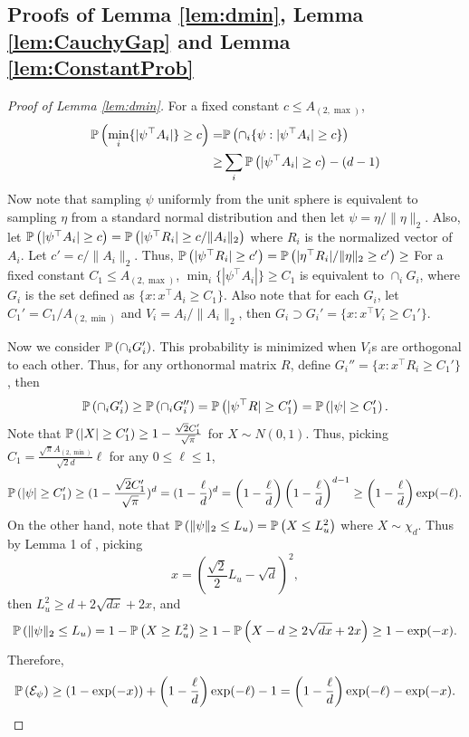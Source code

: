 \subsection{Proofs of Lemma \ref{lem:dmin}, Lemma \ref{lem:CauchyGap} and Lemma \ref{lem:ConstantProb}}
\begin{proof}[Proof of Lemma \ref{lem:dmin}]
For a fixed constant $c \le A_{(2,\max)}$,
\begin{align*}
\mathbb{P}\left(\min_i \{|\psi^{\top}A_i|\} \ge c\right) = & \mathbb{P}\left(\cap_i\{\psi : |\psi^{\top}A_i|\ge c\}\right)\\
 \ge & \sum_i \mathbb{P}\left(|\psi^{\top}A_i|\ge c\right) - (d-1)
\end{align*}
Now note that sampling $\psi$ uniformly from the unit sphere is equivalent to sampling $\eta$ from a standard normal distribution and then let $\psi = \eta/ \|\eta\|_2$.
Also, let $\mathbb{P}\left(|\psi^{\top}A_i|\ge c\right) = \mathbb{P}\left(|\psi^{\top}R_i|\ge c/\|A_i\|_2\right)$ where $R_i$ is the normalized vector of $A_i$. 
Let $c' = c/\|A_i\|_2$. 
Thus, $ \mathbb{P}\left(|\psi^{\top}R_i|\ge c'\right) = \mathbb{P}\left(|\eta^{\top}R_i|/\|\eta\|_2\ge c'\right) \ge $
\fi
For a fixed constant $C_1 \le A_{(2,\max)}$, $\min_i \{|\psi^{\top}A_i|\} \ge C_1$ is equivalent to  $\cap_i G_i$, where $G_i$ is the set defined as $\{x: x^{\top}A_i\ge C_1\}$.  
Also note that for each $G_i$, let $C_1' = C_1/A_{(2,\min)}$ and $V_i = A_i/\|A_i\|_2$, then $G_i \supset G_i' = \{x: x^{\top}V_i\ge C_1'\}$.

Now we consider $\mathbb{P}\left(\cap_i G_i'\right)$. 
This probability is minimized when $V_i$s are orthogonal to each other. 
Thus, for any orthonormal matrix $R$, define $G_i'' = \{x: x^{\top}R_i\ge C_1'\}$, then 
\[
\mathbb{P}\left(\cap_i G_i'\right) \ge \mathbb{P}\left(\cap_i G_i''\right) = \mathbb{P}\left(|\psi^{\top}R| \ge C_1'\right) = \mathbb{P}\left(|\psi| \ge C_1'\right).
\]
Note that $\mathbb{P}\left(|X|\ge C_1'\right) \ge 1- \frac{\sqrt{2}C_1'}{\sqrt{\pi}}$ for $X\sim N(0,1)$. Thus, picking $C_1 = \frac{\sqrt{\pi}A_{(2,\min)}}{\sqrt{2}d} \ell$ for any $0\le \ell \le 1$, 
\begin{equation}
\label{eq:GaussianLowerBound}
\mathbb{P}\left(|\psi| \ge C_1'\right) \ge (1- \frac{\sqrt{2}C_1'}{\sqrt{\pi}})^d = (1-\frac{\ell}{d})^d = \left(1- \frac{\ell}{d}\right)\left(1-\frac{\ell}{d}\right)^{d-1} \ge \left(1- \frac{\ell}{d}\right)\exp(-\ell).
\end{equation}
On the other hand, note that $\mathbb{P}\left(\|\psi\|_2 \le L_u\right) = \mathbb{P}\left(X \le L_u^2\right)$ where $X \sim \chi_d$.
Thus by Lemma 1 of \citep{laurent2000adaptive}, picking
\[
x = \left(\frac{\sqrt{2}}{2}L_u - \sqrt{d}\right)^2,
\]
then $L_u^2 \ge d+2\sqrt{dx}+2x$, and
\begin{equation}
\label{eq:ProbEpsi}
\mathbb{P}\left(\|\psi\|_2 \le L_u\right) = 1- \mathbb{P}\left(X\ge L_u^2\right) \ge 1- \mathbb{P}\left(X - d\ge 2\sqrt{dx} +2x\right) \ge 1-\exp(-x).
\end{equation}
Therefore, 
\begin{equation}
\label{eq:ProbEpsi2}
\mathbb{P}\left(\mathcal{E}_{\psi}\right) \ge (1-\exp(-x))+\left(1- \frac{\ell}{d}\right)\exp(-\ell)-1 = \left(1- \frac{\ell}{d}\right)\exp(-\ell)-\exp(-x).
\end{equation}
\end{proof}

